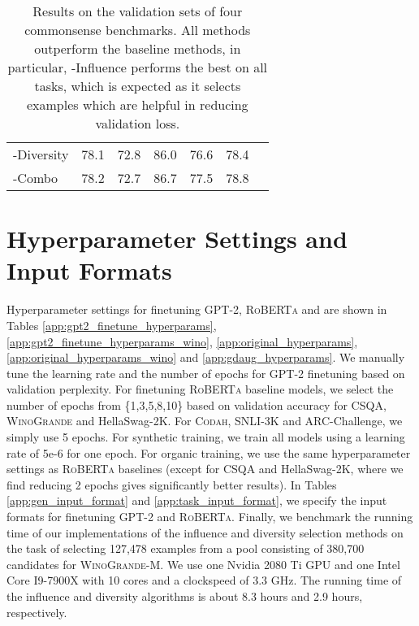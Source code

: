 \documentclass[11pt,a4paper]{article}
\newcommand{\gdaug}{}
\newcommand{\winogrande}{\textsc{WinoGrande}\xspace}
\newcommand{\codah}{\textsc{Codah}\xspace}
\newcommand{\roberta}{\textsc{RoBERTa}\xspace}
\begin{document}
\begin{table*}[]
\begin{tabular}{lllllll}
\gdaug-Diversity & 78.1                                                 & 72.8                                                       & 86.0                                                  & 76.6                                                                      &78.4                                     \\ 
\gdaug-Combo     & 78.2                                                 & 72.7                                                       & 86.7                                                  & 77.5                                                               &78.8\\ \bottomrule
\end{tabular}
\caption{Results on the validation sets of four commonsense benchmarks. 
All \gdaug methods outperform the baseline methods, in particular, \gdaug-Influence performs the best on all tasks, which is expected as it selects examples which are helpful in reducing validation loss.
}
\label{val_res}
\end{table*}






\section{Hyperparameter Settings and Input Formats }
\label{app:hyp}
Hyperparameter settings for finetuning GPT-2, \roberta and \gdaug are shown in Tables \ref{app:gpt2_finetune_hyperparams},  \ref{app:gpt2_finetune_hyperparams_wino}, \ref{app:original_hyperparams}, \ref{app:original_hyperparams_wino} and \ref{app:gdaug_hyperparams}. We manually tune the learning rate and the number of epochs for GPT-2 finetuning based on validation perplexity. For finetuning \roberta baseline models, we select the number of epochs from \{1,3,5,8,10\} based on validation accuracy for CSQA, \winogrande and HellaSwag-2K. For \codah, SNLI-3K and ARC-Challenge, we simply use 5 epochs. For \gdaug synthetic training, we train all models using a learning rate of 5e-6 for one epoch. For \gdaug organic training, we use the same hyperparameter settings as \roberta baselines (except for CSQA and HellaSwag-2K, where we find reducing 2 epochs gives significantly better results). In Tables \ref{app:gen_input_format} and \ref{app:task_input_format}, we specify the input formats for finetuning GPT-2 and \roberta.  Finally, we benchmark the running time of our implementations of the influence and diversity selection methods on the task of selecting 127,478 examples from a pool consisting of 380,700 candidates for \winogrande-M. We use one Nvidia 2080 Ti GPU and one Intel Core I9-7900X with 10 cores and a clockspeed of 3.3 GHz. The running time of the influence and diversity algorithms is about 8.3 hours and 2.9 hours, respectively.
\end{document}
